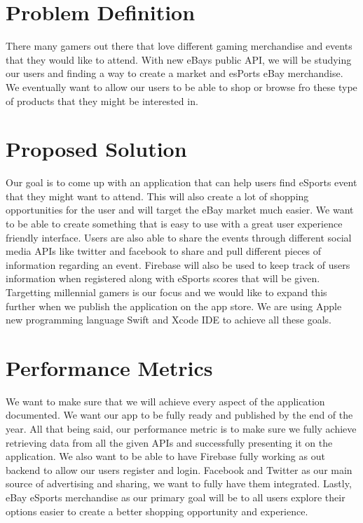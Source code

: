 \documentclass[onecolumn, draftclsnofoot,10pt, compsoc]{IEEEtran}
\begin{document}
\section{Problem Definition}
There many gamers out there that love different gaming merchandise and events that they would like to attend. With new eBays public API, we will be studying our users and finding a way to create a market and esPorts eBay merchandise. We eventually want to allow our users to be able to shop or browse fro these type of products that they might be interested in. 


\section{Proposed Solution}
Our goal is to come up with an application that can help users find eSports event that 
they might want to attend. This will also create a lot of shopping opportunities for the user and will target the eBay market much easier. We want to be able to create something that is easy to use with a great user experience friendly interface. Users are also able to share the events through different social media APIs like twitter and facebook to share and pull different pieces of information regarding an event. Firebase will also be used to keep track of users information when registered along with eSports scores that will be given. Targetting millennial gamers is our focus and we would like to expand this further when we publish the application on the app store. We are using Apple new programming language Swift and Xcode IDE to achieve all these goals.

\section{Performance Metrics}
We want to make sure that we will achieve every aspect of the application documented. We want our app to be fully ready and published by the end of the year. All that being said, our performance metric is to make sure we fully achieve retrieving data from all the given APIs and successfully presenting it on the application. We also want to be able to have Firebase fully working as out backend to allow our users register and login. Facebook and Twitter as our main source of advertising and sharing, we want to fully have them integrated. Lastly, eBay eSports merchandise as our primary goal will be to all users explore their options easier to create a better shopping opportunity and experience.
\end{document}
